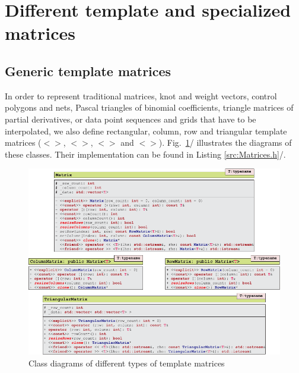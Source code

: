 \documentclass[b5paper, twosided]{book}
\newcommand{\CBlue}[1]{{\color[rgb]{0.0, 0.0, 0.9}{#1}}}
\newcommand{\CPurple}[1]{{\color[rgb]{1.0, 0.0, 0.6}{#1}}}
\DeclareRobustCommand{\mref}[1]{\ref{#1}{\relsize{-1}/\pageref{#1}}}
\begin{document}



\section{Different template and specialized matrices}

\subsection{Generic template matrices}

In order to  represent traditional matrices, knot and weight vectors, control polygons and nets, Pascal triangles of binomial coefficients, triangle matrices of partial derivatives, or data point sequences and grids that have to be interpolated, we also define rectangular, column, row and triangular template matrices (\CBlue{Matrix}$<$\CPurple{T}$>$, \CBlue{ColumnMatrix}$<$\CPurple{T}$>$, \CBlue{RowMatrix}$<$\CPurple{T}$>$ and \CBlue{TriangularMatrix}$<$\CPurple{T}$>$). Fig.\ \mref{fig:UMLTemplateMatrices} illustrates the diagrams of these classes. Their implementation can be found in Listing \mref{src:Matrices.h}.

\begin{figure}[!h]
	\centering
	\includegraphics[]{images/UMLTemplateMatrices+.pdf}
	\caption{Class diagrams of different types of template matrices}
	\label{fig:UMLTemplateMatrices}
\end{figure}
\end{document}
